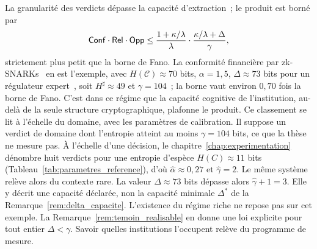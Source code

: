 \begin{sloppypar}
La granularit\'e des verdicts d\'epasse la capacit\'e d'extraction~; le produit
est born\'e par
\begin{equation}
\mathsf{Conf} \cdot \mathsf{Rel} \cdot \mathsf{Opp} \leq
\frac{1+\kappa/\lambda}{\lambda}\cdot\frac{\kappa/\lambda+\Delta}{\gamma},
\end{equation}
strictement plus petit que la borne de Fano. La conformit\'e financi\`ere par
zk-SNARKs~\cite{Groth16,BCTV14} en est l'exemple, avec $H(\mathcal{C}) \approx 70$
bits, $\alpha = 1{,}5$, $\Delta \approx 73$ bits pour un r\'egulateur
expert~\cite{BaselIII}, soit $H^\sharp \approx 49$ et $\gamma = 104$~; la borne
vaut environ $0{,}70$ fois la borne de Fano. C'est dans ce r\'egime que la
capacit\'e cognitive de l'institution, au-del\`a de la seule structure
cryptographique, plafonne le produit. Ce classement se lit \`a l'\'echelle du domaine, avec les
param\`etres de calibration. Il suppose un verdict de domaine dont l'entropie atteint au moins
$\gamma = 104$ bits, ce que la th\`ese ne mesure pas. \`A l'\'echelle d'une d\'ecision, le
chapitre~\ref{chap:experimentation} d\'enombre huit verdicts pour une entropie d'esp\`ece
$H(C) \approx 11$ bits (Tableau~\ref{tab:parametres_reference}), d'o\`u $\hat\alpha \approx 0{,}27$ et
$\hat\gamma = 2$. Le m\^eme syst\`eme rel\`eve alors du contexte rare. La valeur $\Delta \approx 73$ bits d\'epasse alors $\hat\gamma + 1 = 3$. Elle y d\'ecrit une capacit\'e d\'eclar\'ee, non la capacit\'e minimale $\Delta^*$ de la Remarque~\ref{rem:delta_capacite}. L'existence du r\'egime riche
ne repose pas sur cet exemple. La Remarque~\ref{rem:temoin_realisable} en donne une loi
explicite pour tout entier $\Delta < \gamma$. Savoir quelles institutions l'occupent rel\`eve du programme
de mesure.


\end{sloppypar}
